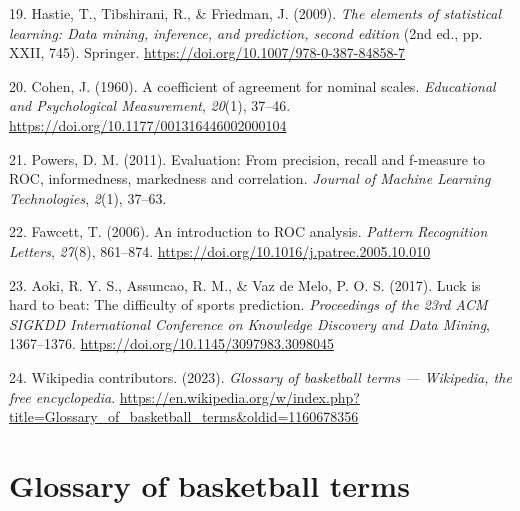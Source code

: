 \documentclass[
  12pt,
  a4paper,
]{article}
\newlength{\cslhangindent}
\newlength{\cslentryspacingunit} %
\newenvironment{CSLReferences}[2] %
 {%
  \setlength{\parindent}{0pt}
  \ifodd #1
  \let\oldpar\par
  \def\par{\hangindent=\cslhangindent\oldpar}
  \fi
  \setlength{\parskip}{#2\cslentryspacingunit}
 }%
 {}
\begin{document}
\begin{CSLReferences}{1}{0}
\leavevmode{}%
19. Hastie, T., Tibshirani, R., \& Friedman, J. (2009). \emph{The elements of statistical learning: Data mining, inference, and prediction, second edition} (2nd ed., pp. XXII, 745). Springer. \url{https://doi.org/10.1007/978-0-387-84858-7}

\leavevmode{}%
20. Cohen, J. (1960). A coefficient of agreement for nominal scales. \emph{Educational and Psychological Measurement}, \emph{20}(1), 37--46. \url{https://doi.org/10.1177/001316446002000104}

\leavevmode{}%
21. Powers, D. M. (2011). Evaluation: From precision, recall and f-measure to ROC, informedness, markedness and correlation. \emph{Journal of Machine Learning Technologies}, \emph{2}(1), 37--63.

\leavevmode{}%
22. Fawcett, T. (2006). An introduction to ROC analysis. \emph{Pattern Recognition Letters}, \emph{27}(8), 861--874. \url{https://doi.org/10.1016/j.patrec.2005.10.010}

\leavevmode{}%
23. Aoki, R. Y. S., Assuncao, R. M., \& Vaz de Melo, P. O. S. (2017). Luck is hard to beat: The difficulty of sports prediction. \emph{Proceedings of the 23rd ACM SIGKDD International Conference on Knowledge Discovery and Data Mining}, 1367--1376. \url{https://doi.org/10.1145/3097983.3098045}

\leavevmode{}%
24. Wikipedia contributors. (2023). \emph{Glossary of basketball terms --- {Wikipedia}{,} the free encyclopedia}. \url{https://en.wikipedia.org/w/index.php?title=Glossary_of_basketball_terms\&oldid=1160678356}

\end{CSLReferences}

\newpage

\hypertarget{appendix-appendix}{%
\appendix}


\hypertarget{glossary}{%
\section{Glossary of basketball terms}\label{glossary}}
\end{document}
